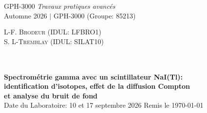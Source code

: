 \documentclass[11pt,letterpaper]{article}
\begin{document}
\thispagestyle{empty} %
\begin{center}

\noindent
\begin{minipage}[t]{0.5\textwidth}
\raggedright
{\large GPH-3000 \textit{Travaux pratiques avancés}}\\
{\large Automne 2026 $\vert$ GPH-3000 (Groupe: 85213)}
\end{minipage}%
\begin{minipage}[t]{0.5\textwidth}
\raggedleft
{\large \textsc{L-F. Brodeur (IDUL: LFBRO1)}}\\
{\large \textsc{S. L-Tremblay (IDUL: SILAT10)}}
\end{minipage}
\\~\\
\vspace{1em}
{\Large \textbf{Spectrométrie gamma avec un scintillateur NaI(Tl):} } \\
{\Large \textbf{identification d'isotopes, effet de la diffusion Compton} } \\
{\Large \textbf{et analyse du bruit de fond} } \\[0.3em]
{\large Date du Laboratoire: 10 et 17 septembre 2026 \qquad\qquad\qquad Remis le \today}

\end{center}

\vspace{0.5em}
\end{document}

